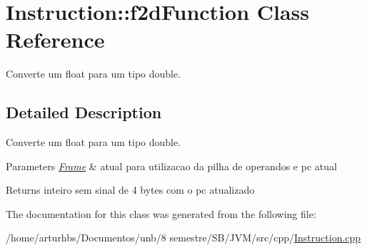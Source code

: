 \hypertarget{classInstruction_1_1f2dFunction}{}\section{Instruction\+:\+:f2d\+Function Class Reference}
\label{classInstruction_1_1f2dFunction}


Converte um float para um tipo double.  




\subsection{Detailed Description}
Converte um float para um tipo double. 


\begin{DoxyParams}{Parameters}
{\em \hyperlink{classFrame}{Frame}} & atual para utilizacao da pilha de operandos e pc atual \\
\hline
\end{DoxyParams}
\begin{DoxyReturn}{Returns}
inteiro sem sinal de 4 bytes com o pc atualizado 
\end{DoxyReturn}


The documentation for this class was generated from the following file\+:\begin{DoxyCompactItemize}
\item 
/home/arturhbs/\+Documentos/unb/8 semestre/\+S\+B/\+J\+V\+M/src/cpp/\hyperlink{Instruction_8cpp}{Instruction.\+cpp}\end{DoxyCompactItemize}
